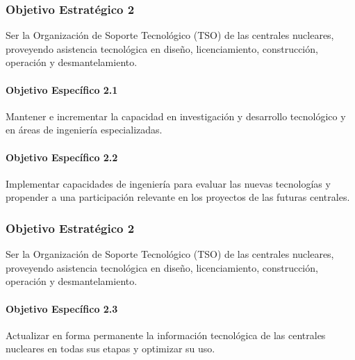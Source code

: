 \subsubsection{Objetivo Estratégico 2}

Ser la Organización de Soporte Tecnológico (TSO)
de las centrales nucleares, proveyendo asistencia tecnológica en diseño,
licenciamiento, construcción, operación y desmantelamiento.

\paragraph{Objetivo Específico 2.1}
Mantener e incrementar la capacidad en investigación y
desarrollo tecnológico y en áreas de ingeniería especializadas.

\paragraph{Objetivo Específico 2.2}

Implementar capacidades de ingeniería para evaluar las nuevas
tecnologías y propender a una participación relevante en los proyectos de las futuras
centrales.

\subsubsection{Objetivo Estratégico 2}

Ser la Organización de Soporte Tecnológico (TSO)
de las centrales nucleares, proveyendo asistencia tecnológica en diseño,
licenciamiento, construcción, operación y desmantelamiento.

\paragraph{Objetivo Específico 2.3}

Actualizar en forma permanente la información tecnológica de
las centrales nucleares en todas sus etapas y optimizar su uso.

